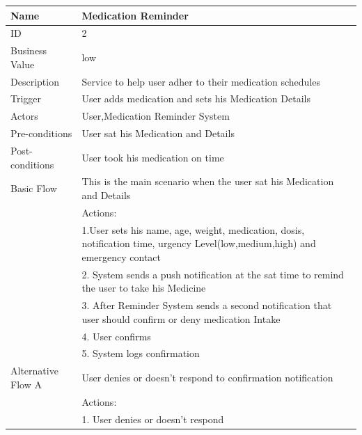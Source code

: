 \documentclass{article}
\begin{document}
\begin{table}[h!]
    \begin{tabularx}{\textwidth}{|>{\raggedright\arraybackslash}p{}|X|}
        \hline
        Name             & Medication Reminder                                \\ \hline
        ID               & 2                                                                                     \\ \hline
        Business Value   & low                                                                                  \\ \hline
        Description      & Service to help user adher to their medication schedules  \\ \hline
        Trigger          & User adds medication and sets his Medication Details\\ \hline
        Actors           & User,Medication Reminder System                               \\ \hline
        Pre-conditions   & User sat his Medication and Details                                    \\ \hline
        Post-conditions  & User took his medication on time                                                   \\ \hline
        Basic Flow       & This is the main scenario when the user sat his Medication and Details \\ \hline
                         & Actions: \\
                         & 1.User sets his name, age, weight, medication, dosis, notification time, urgency Level(low,medium,high) and emergency contact\\
                         & 2. System sends a push notification at the sat time to remind the user to take his Medicine \\
                         & 3. After Reminder System sends a second notification that user should confirm or deny medication Intake\\
                         & 4. User confirms \\
                         & 5. System logs confirmation \\ \hline
        Alternative Flow A & User denies or doesn't respond to confirmation notification \\
                         & Actions: \\
                         & 1. User denies or doesn't respond \\

\end{tabularx}
\end{table}
\end{document}
